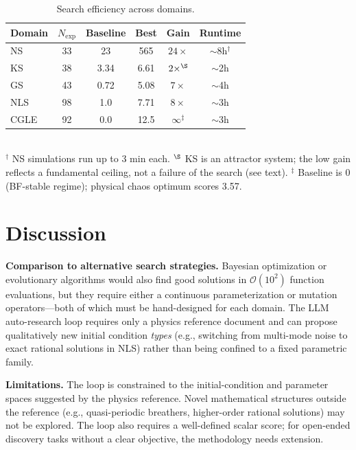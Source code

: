 \documentclass[11pt]{article}
\begin{document}
\begin{table}[t]
\centering
\caption{Search efficiency across domains.}
\label{tab:efficiency}
\begin{tabular}{lccccc}
\toprule
Domain & $N_\text{exp}$ & Baseline & Best & Gain & Runtime \\
\midrule
NS    & 33        & 23    & 565  & $24\times$ & $\sim$8h$^\dagger$ \\
KS    & 38        & 3.34  & 6.61 & $2\times^\S$  & $\sim$2h \\
GS    & 43        & 0.72  & 5.08 & $7\times$  & $\sim$4h \\
NLS   & 98        & 1.0   & 7.71 & $8\times$  & $\sim$3h \\
CGLE  & 92        & 0.0   & 12.5 & $\infty^\ddagger$  & $\sim$3h \\
\bottomrule
\end{tabular}\\[4pt]
{\small $^\dagger$ NS simulations run up to 3 min each.
$^\S$ KS is an attractor system; the low gain reflects a fundamental ceiling,
not a failure of the search (see text).
$^\ddagger$ Baseline is 0 (BF-stable regime); physical chaos optimum
scores 3.57.}
\end{table}

\section{Discussion}
\label{sec:discussion}

\noindent\textbf{Comparison to alternative search strategies.}
Bayesian optimization or evolutionary algorithms would also find good
solutions in $\mathcal{O}(10^2)$ function evaluations, but they require
either a continuous parameterization or mutation operators---both of which
must be hand-designed for each domain.
The LLM auto-research loop requires only a physics reference document
and can propose qualitatively new initial condition \emph{types}
(e.g., switching from multi-mode noise to exact rational solutions in NLS)
rather than being confined to a fixed parametric family.

\noindent\textbf{Limitations.}
The loop is constrained to the initial-condition and parameter spaces
suggested by the physics reference.
Novel mathematical structures outside the reference (e.g., quasi-periodic
breathers, higher-order rational solutions) may not be explored.
The loop also requires a well-defined scalar score; for open-ended discovery
tasks without a clear objective, the methodology needs extension.
\end{document}
